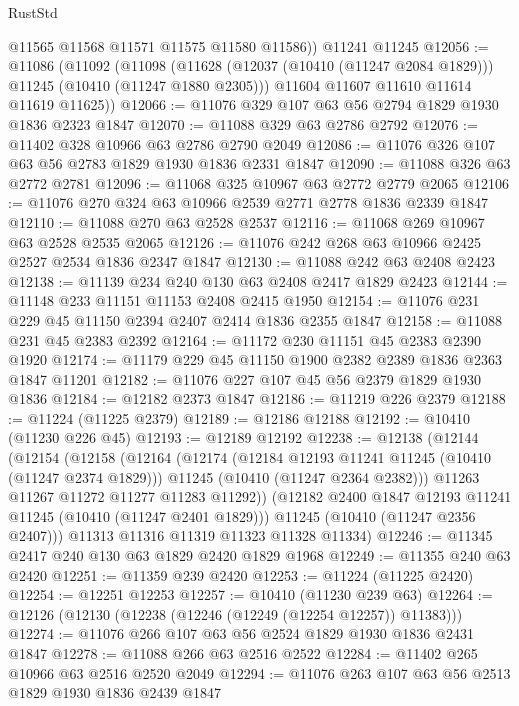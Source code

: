 \begin{lexlean}{RustStd}
\begin{coremodule}
        @11565
        @11568
        @11571
        @11575
        @11580
        @11586))
    @11241
    @11245
@12056 := @11086
    (@11092
      (@11098
        (@11628 (@12037 (@10410 (@11247 @2084 @1829))) @11245 (@10410 (@11247 @1880 @2305)))
        @11604
        @11607
        @11610
        @11614
        @11619
        @11625))
@12066 := @11076 @329 @107 @63 @56 @2794 @1829 @1930 @1836 @2323 @1847
@12070 := @11088 @329 @63 @2786 @2792
@12076 := @11402 @328 @10966 @63 @2786 @2790 @2049
@12086 := @11076 @326 @107 @63 @56 @2783 @1829 @1930 @1836 @2331 @1847
@12090 := @11088 @326 @63 @2772 @2781
@12096 := @11068 @325 @10967 @63 @2772 @2779 @2065
@12106 := @11076 @270 @324 @63 @10966 @2539 @2771 @2778 @1836 @2339 @1847
@12110 := @11088 @270 @63 @2528 @2537
@12116 := @11068 @269 @10967 @63 @2528 @2535 @2065
@12126 := @11076 @242 @268 @63 @10966 @2425 @2527 @2534 @1836 @2347 @1847
@12130 := @11088 @242 @63 @2408 @2423
@12138 := @11139 @234 @240 @130 @63 @2408 @2417 @1829 @2423
@12144 := @11148 @233 @11151 @11153 @2408 @2415 @1950
@12154 := @11076 @231 @229 @45 @11150 @2394 @2407 @2414 @1836 @2355 @1847
@12158 := @11088 @231 @45 @2383 @2392
@12164 := @11172 @230 @11151 @45 @2383 @2390 @1920
@12174 := @11179 @229 @45 @11150 @1900 @2382 @2389 @1836 @2363 @1847 @11201
@12182 := @11076 @227 @107 @45 @56 @2379 @1829 @1930 @1836
@12184 := @12182 @2373 @1847
@12186 := @11219 @226 @2379
@12188 := @11224 (@11225 @2379)
@12189 := @12186 @12188
@12192 := @10410 (@11230 @226 @45)
@12193 := @12189 @12192
@12238 := @12138
    (@12144
      (@12154
        (@12158
          (@12164
            (@12174
              (@12184 @12193 @11241 @11245 (@10410 (@11247 @2374 @1829)))
              @11245
              (@10410 (@11247 @2364 @2382)))
            @11263
            @11267
            @11272
            @11277
            @11283
            @11292))
        (@12182 @2400 @1847 @12193 @11241 @11245 (@10410 (@11247 @2401 @1829)))
        @11245
        (@10410 (@11247 @2356 @2407)))
      @11313
      @11316
      @11319
      @11323
      @11328
      @11334)
@12246 := @11345 @2417 @240 @130 @63 @1829 @2420 @1829 @1968
@12249 := @11355 @240 @63 @2420
@12251 := @11359 @239 @2420
@12253 := @11224 (@11225 @2420)
@12254 := @12251 @12253
@12257 := @10410 (@11230 @239 @63)
@12264 := @12126 (@12130 (@12238 (@12246 (@12249 (@12254 @12257)) @11383)))
@12274 := @11076 @266 @107 @63 @56 @2524 @1829 @1930 @1836 @2431 @1847
@12278 := @11088 @266 @63 @2516 @2522
@12284 := @11402 @265 @10966 @63 @2516 @2520 @2049
@12294 := @11076 @263 @107 @63 @56 @2513 @1829 @1930 @1836 @2439 @1847

\end{coremodule}
\end{lexlean}
